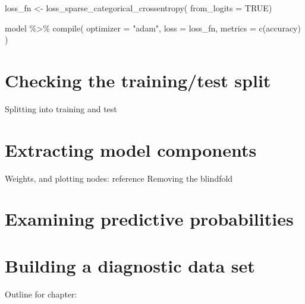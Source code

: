 \documentclass[
  letterpaper,
]{krantz}
\newenvironment{Shaded}{\begin{snugshade}}{\end{snugshade}}
\newcommand{\AttributeTok}[1]{\textcolor[rgb]{0.40,0.45,0.13}{#1}}
\newcommand{\ConstantTok}[1]{\textcolor[rgb]{0.56,0.35,0.01}{#1}}
\newcommand{\FunctionTok}[1]{\textcolor[rgb]{0.28,0.35,0.67}{#1}}
\newcommand{\NormalTok}[1]{\textcolor[rgb]{0.00,0.23,0.31}{#1}}
\newcommand{\OtherTok}[1]{\textcolor[rgb]{0.00,0.23,0.31}{#1}}
\newcommand{\SpecialCharTok}[1]{\textcolor[rgb]{0.37,0.37,0.37}{#1}}
\newcommand{\StringTok}[1]{\textcolor[rgb]{0.13,0.47,0.30}{#1}}
\begin{document}
\begin{Shaded}
\begin{Highlighting}[]
\NormalTok{loss\_fn }\OtherTok{\textless{}{-}} \FunctionTok{loss\_sparse\_categorical\_crossentropy}\NormalTok{(}
  \AttributeTok{from\_logits =} \ConstantTok{TRUE}\NormalTok{)}

\NormalTok{model }\SpecialCharTok{\%\textgreater{}\%} \FunctionTok{compile}\NormalTok{(}
  \AttributeTok{optimizer =} \StringTok{"adam"}\NormalTok{,}
  \AttributeTok{loss      =}\NormalTok{ loss\_fn,}
  \AttributeTok{metrics   =} \FunctionTok{c}\NormalTok{(}\StringTok{\textquotesingle{}accuracy\textquotesingle{}}\NormalTok{)}
\NormalTok{)}
\end{Highlighting}
\end{Shaded}

\hypertarget{checking-the-trainingtest-split}{%
\section{Checking the training/test
split}\label{checking-the-trainingtest-split}}

Splitting into training and test

\hypertarget{extracting-model-components}{%
\section{Extracting model
components}\label{extracting-model-components}}

Weights, and plotting nodes: reference Removing the blindfold

\hypertarget{examining-predictive-probabilities}{%
\section{Examining predictive
probabilities}\label{examining-predictive-probabilities}}


\hypertarget{building-a-diagnostic-data-set}{%
\section{Building a diagnostic data
set}\label{building-a-diagnostic-data-set}}

Outline for chapter:
\end{document}
